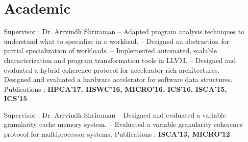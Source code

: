 
\section{Academic}
{Supervisor : Dr. Arrvindh Shriraman \newline{} 
-- Adapted program analysis techniques to understand what to specialize in a workload. \newline{}
-- Designed an abstraction for partial specialization of workloads. \newline{}
-- Implemented automated, scalable characterization and program transformation tools in LLVM. \newline{}
-- Designed and evaluated a hybrid coherence protocol for accelerator rich architectures. \newline{}
-- Designed and evaluated a hardware accelerator for software data structures. \newline{}
Publications : \textbf{HPCA'17, IISWC'16, MICRO'16, ICS'16, ISCA'15, ICS'15}}

\vspace{9pt}

{Supervisor : Dr. Arrvindh Shriraman \newline{} 
-- Designed and evaluated a variable granularity cache memory system. \newline{}
-- Evaluated a variable granularity coherence protocol for multiprocessor systems. \newline{}
Publications : \textbf{ISCA'13, MICRO'12}}

\vspace{9pt}



